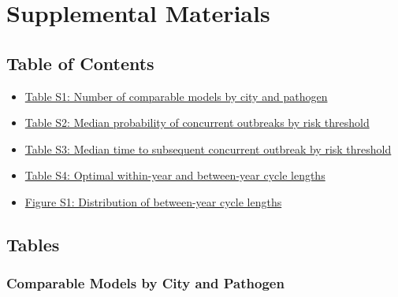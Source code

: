\section{Supplemental Materials}

\subsection*{Table of Contents}
\begin{itemize}
    \item \hyperref[tab:comparable_models]{Table S1: Number of comparable models by city and pathogen} \dotfill \pageref{tab:comparable_models}
    \item \hyperref[tab:joint_outbreak_probability]{Table S2: Median probability of concurrent outbreaks by risk threshold} \dotfill \pageref{tab:joint_outbreak_probability}
    \item \hyperref[tab:survival_median_times]{Table S3: Median time to subsequent concurrent outbreak by risk threshold} \dotfill \pageref{tab:survival_median_times}
    \item \hyperref[tab:optimal_cycles]{Table S4: Optimal within-year and between-year cycle lengths} \dotfill \pageref{tab:optimal_cycles}
    \item \hyperref[fig:supplemental_cycle_lengths]{Figure S1: Distribution of between-year cycle lengths} \dotfill \pageref{fig:supplemental_cycle_lengths}
\end{itemize}

\clearpage

\subsection{Tables}

\subsubsection{Comparable Models by City and Pathogen}
\label{subsec:comparable_models}


